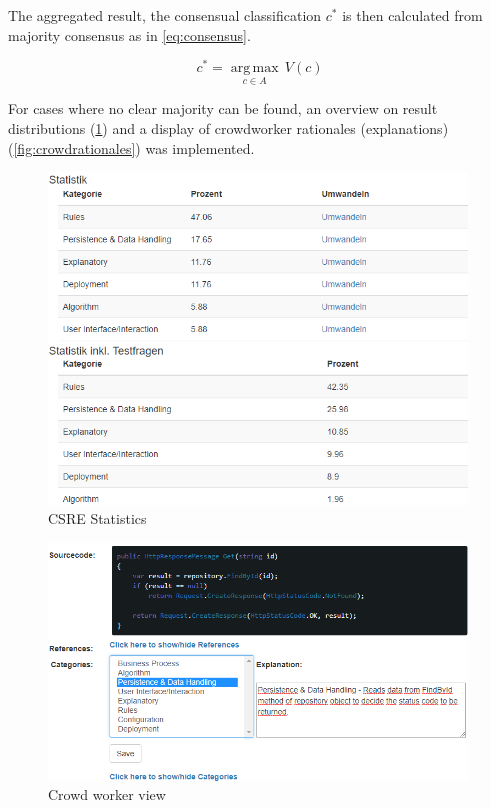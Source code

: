 The aggregated result, the consensual classification \(c^*\) is then calculated from majority consensus as in \cref{eq:consensus}.

\begin{equation}c^*=\underset{c \in A}{\operatorname{arg\,max}}\, V(c)\label{eq:consensus}\end{equation}

For cases where no clear majority can be found, an overview on result distributions (\cref{fig:crowdstatistics}) and a display of crowdworker rationales (explanations) (\cref{fig:crowdrationales}) was implemented.

\begin{figure}
\hypertarget{fig:crowdstatistics}{%
\centering
\includegraphics[width=0.99\textwidth]{../figures/screenshots/csre_statistics.png}
\caption{CSRE Statistics}\label{fig:crowdstatistics}
}
\end{figure}

\begin{figure}
\hypertarget{fig:crowdview}{%
\centering
\includegraphics[width=0.99\textwidth]{../figures/screenshots/cw_view.png}
\caption{Crowd worker view}\label{fig:crowdview}
}
\end{figure}

